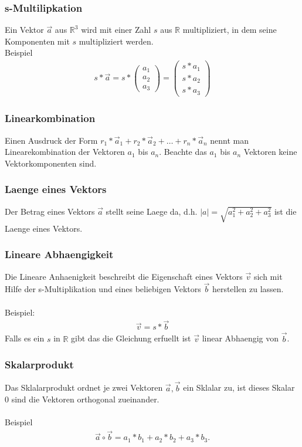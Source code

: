 \documentclass[a4paper]{article} %
\begin{document}
	\subsubsection{s-Multilipkation}
	Ein Vektor $\vec{a}$ aus $\mathbb{R}^3$  wird mit einer Zahl $s$ aus $\mathbb{R}$ multipliziert, in dem seine Komponenten mit $s$ multipliziert werden.\\Beispiel
	\begin{align*}  s*\vec{a}=s*\begin{pmatrix}a_1\\a_2\\a_3\end{pmatrix}=\begin{pmatrix}s*a_1\\s*a_2\\s*a_3\end{pmatrix} \end{align*}
	\subsubsection{Linearkombination}
	Einen Ausdruck der Form $r_1*\vec{a}_1 + r_2*\vec{a}_2 + \hdots + r_n*\vec{a}_n $ nennt man Linearekombination der Vektoren $a_1$ bis $a_n$.
	Beachte das $a_1$ bis $a_n$ Vektoren keine Vektorkomponenten sind.
	\subsubsection{Laenge eines Vektors}
	Der Betrag eines Vektors $\vec{a}$ stellt seine Laege da, d.h. $|a|=\sqrt{a_1^2+a_2^2+a_3^2}$ ist die Laenge eines Vektors.
	\subsubsection{Lineare Abhaengigkeit}
	Die Lineare Anhaenigkeit beschreibt die Eigenschaft eines Vektors $\vec{v}$ sich mit Hilfe der s-Multiplikation und eines beliebigen Vektors $\vec{b}$ herstellen zu lassen.
	\\\\Beispiel:
	\begin{align*} \vec{v}=s*\vec{b} \end{align*}
	Falls es ein $s$ in $\mathbb{R}$ gibt das die Gleichung erfuellt ist $\vec{v}$ linear Abhaengig von $\vec{b}$.
	\subsubsection{Skalarprodukt}
	Das Sklalarprodukt ordnet je zwei Vektoren $\vec{a},\vec{b}$ ein Sklalar zu, ist dieses Skalar $0$ sind die Vektoren orthogonal zueinander.\\\\Beispiel  \begin{align*} \vec{a} \circ \vec{b}=a_1*b_1+a_2*b_2+a_3*b_3. \end{align*}
\end{document}
